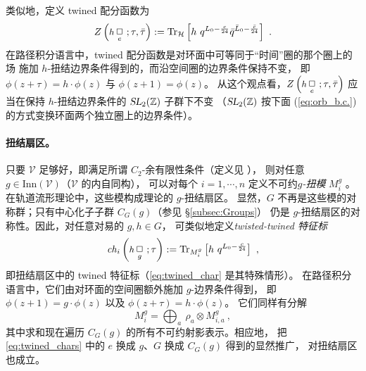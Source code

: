 \documentclass[11pt,a4paper,fontset=windows]{ctexart}
\numberwithin{equation}{section}
\newcommand{\SL}{\operatorname{\textsl{SL}}}      %
\newcommand{\myparagraph}[1]{\paragraph{#1}\mbox\\}
\newcommand{\ZZ}{\mathbb{Z}}
\def\rr{\rho}
\def\t{\tau}
\newcommand{\tr}{\operatorname{Tr}}
\newcommand{\eq}[1]{(\ref{#1})}
\begin{document}


类似地，定义 twined 配分函数为
\begin{equation}
\label{eq:twined_part_def}
Z\left(\mbox{\fontsize{9}{10}\selectfont $h\,$}\underset{e}{\Box}~;\t,\bar{\t}\right):=\tr_{\mathcal{H}} \left[h~q^{L_0-\frac{c}{24}}\bar{q}^{\bar{L}_0-\frac{\bar{c}}{24}} \right]~.
\end{equation}
在路径积分语言中，twined 配分函数是对环面中可等同于“时间”圈的那个圈上的场
施加 $h$-扭结边界条件得到的，而沿空间圈的边界条件保持不变，
即 $\phi(z+\tau)=h\cdot\phi(z)$ 与 $\phi(z+1)=\phi(z)$。
从这个观点看，$Z\left(\mbox{\fontsize{9}{10}\selectfont $h\,$}\underset{e}{\Box}~;\t,\bar{\t}\right)$
应当在保持 $h$-扭结边界条件的 $\SL_2(\ZZ)$ 子群下不变
（$\SL_2(\ZZ)$ 按下面 \eq{eq:orb_b.c.} 的方式变换环面两个独立圈上的边界条件）。

\myparagraph{扭结扇区。}
只要 $\mathcal{V}$ 足够好，即满足所谓 $C_2$-余有限性条件（定义见 \cite{MR2201600}），
则对任意 $g\in\text{Inn}(\mathcal{V})$（$\mathcal{V}$ 的内自同构），
可以对每个 $i=1,\cdots,n$ 定义不可约\emph{$g$-扭模} $M^g_i$ \cite{Dong2000}。
在轨道流形理论中，这些模构成理论的 $g$-扭结扇区。
显然，$G$ 不再是这些模的对称群；只有中心化子子群 $C_G(g)$（参见 \S\ref{subsec:Groups}）
仍是 $g$-扭结扇区的对称性。因此，对任意对易的 $g,h\in G$，
可类似地定义\emph{twisted-twined 特征标}
\begin{equation}
\label{eq:twisted-twined_char}
{\it ch}_i\left(\mbox{\fontsize{9}{10}\selectfont $h\,$}\underset{g}{\Box}~;\t\right):=\tr_{M^g_i}\left[h~q^{L_0-\frac{c}{24}}\right]~,
\end{equation}
即扭结扇区中的 twined 特征标（\eqref{eq:twined_char} 是其特殊情形）。
在路径积分语言中，它们由对环面的空间圈额外施加 $g$-边界条件得到，
即 $\phi(z+1)=g\cdot \phi(z)$ 以及 $\phi(z+\tau)=h\cdot \phi(z)$。
它们同样有分解
\begin{equation}
M_i^g=\bigoplus_a~\rr_a\otimes M_{i,a}^g~,
\end{equation}
其中求和现在遍历 $C_G(g)$ 的所有不可约射影表示。相应地，
把 \eqref{eq:twined_chars} 中的 $e$ 换成 $g$、$G$ 换成 $C_G(g)$ 得到的显然推广，
对扭结扇区也成立。
\end{document}
